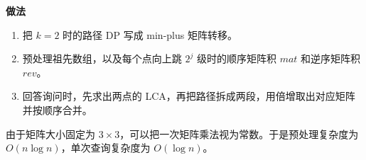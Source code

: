\documentclass{book}
\begin{document}
    \par\medskip
    \noindent\textbf{做法}
    \par\medskip

    \begin{enumerate}[leftmargin=2em,itemsep=1pt,topsep=2pt,parsep=0pt,partopsep=0pt]
        \item 把 $k=2$ 时的路径 DP 写成 min-plus 矩阵转移。
        \item 预处理祖先数组，以及每个点向上跳 $2^j$ 级时的顺序矩阵积 $mat$ 和逆序矩阵积 $rev$。
        \item 回答询问时，先求出两点的 LCA，再把路径拆成两段，用倍增取出对应矩阵并按顺序合并。
    \end{enumerate}

    由于矩阵大小固定为 $3\times 3$，可以把一次矩阵乘法视为常数。于是预处理复杂度为 $O(n\log n)$，单次查询复杂度为 $O(\log n)$。
\end{document}
